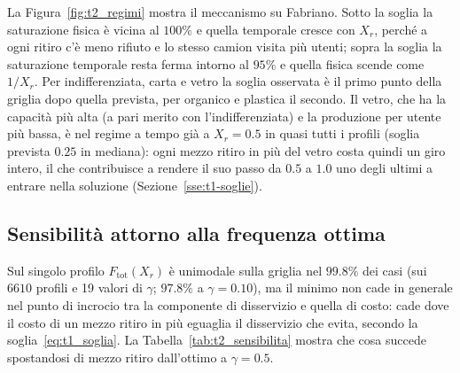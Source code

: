 La Figura~\ref{fig:t2_regimi} mostra il meccanismo su Fabriano. Sotto la soglia la saturazione fisica è vicina al $100\%$ e quella temporale cresce con $X_r$, perché a ogni ritiro c'è meno rifiuto e lo stesso camion visita più utenti; sopra la soglia la saturazione temporale resta ferma intorno al $95\%$ e quella fisica scende come $1/X_r$. Per indifferenziata, carta e vetro la soglia osservata è il primo punto della griglia dopo quella prevista, per organico e plastica il secondo. Il vetro, che ha la capacità più alta (a pari merito con l'indifferenziata) e la produzione per utente più bassa, è nel regime a tempo già a $X_r=0.5$ in quasi tutti i profili (soglia prevista $0.25$ in mediana): ogni mezzo ritiro in più del vetro costa quindi un giro intero, il che contribuisce a rendere il suo passo da $0.5$ a $1.0$ uno degli ultimi a entrare nella soluzione (Sezione~\ref{sse:t1-soglie}).

\subsection{Sensibilità attorno alla frequenza ottima}\label{sse:t2-sensibilita}

Sul singolo profilo $F_{\mathrm{tot}}(X_r)$ è unimodale sulla griglia nel $99.8\%$ dei casi (sui $6610$ profili e 19 valori di $\gamma$; $97.8\%$ a $\gamma=0.10$), ma il minimo non cade in generale nel punto di incrocio tra la componente di disservizio e quella di costo: cade dove il costo di un mezzo ritiro in più eguaglia il disservizio che evita, secondo la soglia~\eqref{eq:t1_soglia}. La Tabella~\ref{tab:t2_sensibilita} mostra che cosa succede spostandosi di mezzo ritiro dall'ottimo a $\gamma=0.5$.

